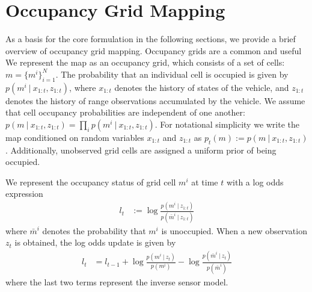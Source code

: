 \section{Occupancy Grid Mapping}
\label{section:occupancy_grid_mapping}

As a basis for the core formulation in the following sections, we provide a brief overview of occupancy grid mapping. Occupancy grids are a common and useful
We represent the map as an occupancy grid, which consists of a set of cells: $m = \{m^{i}\}_{i=1}^{N}$.
The probability that an individual cell is occupied is given by $p\left(m^{i} \ \vert \ x_{1:t}, z_{1:t}\right)$, where $x_{1:t}$ denotes the history of states of the vehicle, and $z_{1:t}$ denotes the history of range observations accumulated by the vehicle.
We assume that cell occupancy probabilities are independent of one another: $p\left(m \ \vert \ x_{1:t}, z_{1:t}\right) = \prod_{i} p\left(m^{i} \ \vert \ x_{1:t}, z_{1:t}\right)$.
For notational simplicity we write the map conditioned on random variables $x_{1:t}$ and $z_{1:t}$ as $p_{t}\left(m\right) := p\left(m \ \vert \ x_{1:t}, z_{1:t}\right)$.
Additionally, unobserved grid cells are assigned a uniform prior of being occupied.

We represent the occupancy status of grid cell $m^i$ at time $t$ with a log odds expression
\begin{align}
  l_t &:= \log \frac{p \left( m^i \ \vert \ z_{1:t} \right)}{p \left( \bar{m}^i \ \vert \ z_{1:t} \right)}
\end{align}
where $\bar{m}^i$ denotes the probability that $m^i$ is unoccupied.
When a new observation $z_t$ is obtained, the log odds update is given by
\begin{align}
  l_t &= l_{t-1} + \log \frac{p\left( m^i \ \vert \ z_t \right)}{p \left( m^i \right)} - \log \frac{p\left( \bar{m}^i \ \vert \ z_t \right)}{p \left(\bar{m}^i \right)}
  \label{eq:logodds_update}
\end{align}
where the last two terms represent the inverse sensor model.
